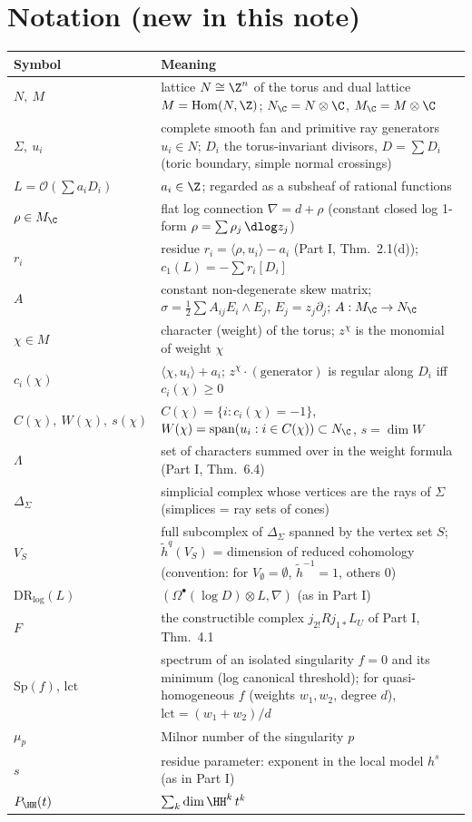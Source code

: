 \section{Notation (new in this note)}\label{sec:notation}
\begin{longtable}{>{\raggedright\arraybackslash}p{3.6cm}>{\raggedright\arraybackslash}p{11.4cm}}
\toprule Symbol & Meaning\\ \midrule\endhead
$N,\ M$ & lattice $N\cong\Z^n$ of the torus and dual lattice $M=\mathrm{Hom}(N,\Z)$; $N_\C=N\otimes\C$, $M_\C=M\otimes\C$\\
$\Sigma,\ u_i$ & complete smooth fan and primitive ray generators $u_i\in N$; $D_i$ the torus-invariant divisors, $D=\sum D_i$ (toric boundary, simple normal crossings)\\
$L=\mathcal O(\sum a_iD_i)$ & $a_i\in\Z$; regarded as a subsheaf of rational functions\\
$\rho\in M_\C$ & flat log connection $\nabla=d+\rho$ (constant closed log 1-form $\rho=\sum\rho_j\,\dlog z_j$)\\
$r_i$ & residue $r_i=\langle\rho,u_i\rangle-a_i$ (Part I, Thm.\ 2.1(d)); $c_1(L)=-\sum r_i[D_i]$\\
$A$ & constant non-degenerate skew matrix; $\sigma=\tfrac12\sum A_{ij}E_i\wedge E_j$, $E_j=z_j\partial_j$; $A:M_\C\to N_\C$\\
$\chi\in M$ & character (weight) of the torus; $z^\chi$ is the monomial of weight $\chi$\\
$c_i(\chi)$ & $\langle\chi,u_i\rangle+a_i$; $z^\chi\cdot(\text{generator})$ is regular along $D_i$ iff $c_i(\chi)\ge0$\\
$C(\chi),\ W(\chi),\ s(\chi)$ & $C(\chi)=\{i:c_i(\chi)=-1\}$, $W(\chi)=\mathrm{span}(u_i:i\in C(\chi))\subset N_\C$, $s=\dim W$\\
$\Lambda$ & set of characters summed over in the weight formula (Part I, Thm.\ 6.4)\\
$\Delta_\Sigma$ & simplicial complex whose vertices are the rays of $\Sigma$ (simplices = ray sets of cones)\\
$V_S$ & full subcomplex of $\Delta_\Sigma$ spanned by the vertex set $S$; $\tilde h^q(V_S)$ = dimension of reduced cohomology (convention: for $V_\emptyset=\emptyset$, $\tilde h^{-1}=1$, others $0$)\\
$\mathrm{DR}_{\log}(L)$ & $(\Omega^\bullet(\log D)\otimes L,\nabla)$ (as in Part I)\\
$F$ & the constructible complex $j_{2!}Rj_{1*}L_U$ of Part I, Thm.\ 4.1\\
$\mathrm{Sp}(f)$, $\mathrm{lct}$ & spectrum of an isolated singularity $f=0$ and its minimum (log canonical threshold); for quasi-homogeneous $f$ (weights $w_1,w_2$, degree $d$), $\mathrm{lct}=(w_1+w_2)/d$\\
$\mu_p$ & Milnor number of the singularity $p$\\
$s$ & residue parameter: exponent in the local model $h^s$ (as in Part I)\\
$P_{\HH}(t)$ & $\sum_k\dim\HH^k\,t^k$\\
\bottomrule
\end{longtable}
